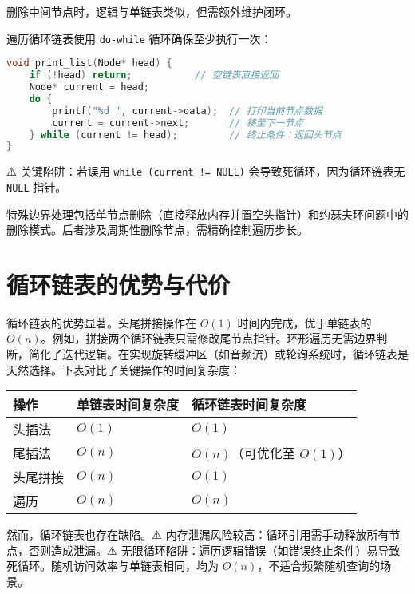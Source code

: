 删除中间节点时，逻辑与单链表类似，但需额外维护闭环。\par
遍历循环链表使用 \texttt{do-while} 循环确保至少执行一次：\par
\begin{lstlisting}[language=c]
void print_list(Node* head) {
    if (!head) return;           // 空链表直接返回
    Node* current = head;
    do {
        printf("%d ", current->data);  // 打印当前节点数据
        current = current->next;       // 移至下一节点
    } while (current != head);         // 终止条件：返回头节点
}
\end{lstlisting}
⚠️ 关键陷阱：若误用 \texttt{while (current != NULL)} 会导致死循环，因为循环链表无 \texttt{NULL} 指针。\par
特殊边界处理包括单节点删除（直接释放内存并置空头指针）和约瑟夫环问题中的删除模式。后者涉及周期性删除节点，需精确控制遍历步长。\par
\chapter{循环链表的优势与代价}
循环链表的优势显著。头尾拼接操作在 $O(1)$ 时间内完成，优于单链表的 $O(n)$。例如，拼接两个循环链表只需修改尾节点指针。环形遍历无需边界判断，简化了迭代逻辑。在实现旋转缓冲区（如音频流）或轮询系统时，循环链表是天然选择。下表对比了关键操作的时间复杂度：\par
\begin{table}[H]
\centering
\begin{tabular}{|l|l|l|}
\hline
操作 & 单链表时间复杂度 & 循环链表时间复杂度 \\
\hline
头插法 & $O(1)$ & $O(1)$ \\
\hline
尾插法 & $O(n)$ & $O(n)$（可优化至 $O(1)$） \\
\hline
头尾拼接 & $O(n)$ & $O(1)$ \\
\hline
遍历 & $O(n)$ & $O(n)$ \\
\hline
\end{tabular}
\end{table}
然而，循环链表也存在缺陷。⚠️ 内存泄漏风险较高：循环引用需手动释放所有节点，否则造成泄漏。⚠️ 无限循环陷阱：遍历逻辑错误（如错误终止条件）易导致死循环。随机访问效率与单链表相同，均为 $O(n)$，不适合频繁随机查询的场景。\par

